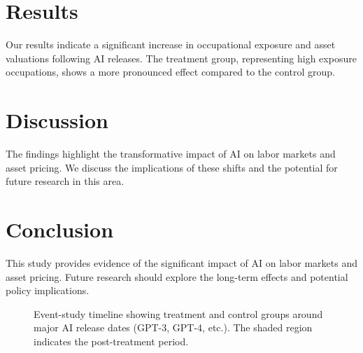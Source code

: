 \documentclass{article}
\begin{document}
\section{Results}
Our results indicate a significant increase in occupational exposure and asset valuations following AI releases. The treatment group, representing high exposure occupations, shows a more pronounced effect compared to the control group.

\section{Discussion}
The findings highlight the transformative impact of AI on labor markets and asset pricing. We discuss the implications of these shifts and the potential for future research in this area.

\section{Conclusion}
This study provides evidence of the significant impact of AI on labor markets and asset pricing. Future research should explore the long-term effects and potential policy implications.

\begin{figure}[htbp]
\centering
{}
\caption{Event-study timeline showing treatment and control groups around major AI release dates (GPT-3, GPT-4, etc.). The shaded region indicates the post-treatment period.}
\end{figure}
\end{document}
